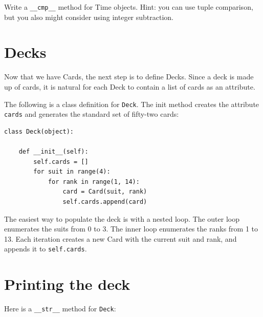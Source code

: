 \documentclass[10pt]{book}
\begin{document}
\begin{CJK}{UTF8}{gbsn}
\begin{exercise}

Write a \verb"__cmp__" method for Time objects.  Hint: you
can use tuple comparison, but you also might consider using
integer subtraction.



\end{exercise}


\section{Decks}

Now that we have Cards, the next step is to define Decks.  Since a
deck is made up of cards, it is natural for each Deck to contain a
list of cards as an attribute.

The following is a class definition for {\tt Deck}.  The
init method creates the attribute {\tt cards} and generates
the standard set of fifty-two cards:

\begin{verbatim}
class Deck(object):

    def __init__(self):
        self.cards = []
        for suit in range(4):
            for rank in range(1, 14):
                card = Card(suit, rank)
                self.cards.append(card)
\end{verbatim}
%
The easiest way to populate the deck is with a nested loop.  The outer
loop enumerates the suits from 0 to 3.  The inner loop enumerates the
ranks from 1 to 13.  Each iteration
creates a new Card with the current suit and rank,
and appends it to {\tt self.cards}.


\section{Printing the deck}
\label{printdeck}

Here is a \verb"__str__" method for {\tt Deck}:


\end{CJK}
\end{document}

